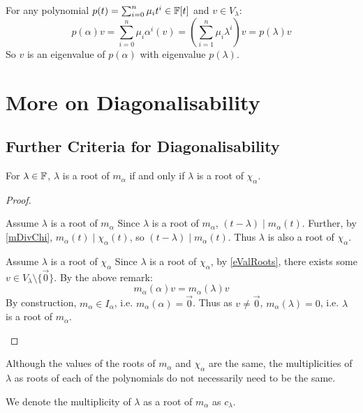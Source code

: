 \documentclass[../main.tex]{subfiles}
\begin{document}
\begin{remark}
  For any polynomial $p(t) = \sum_{i = 0}^{n} \mu_i t^{i} \in \mathbb{F}[t]$ and $v \in V_{\lambda}$:
  \[
    p(\alpha)v = \sum_{i = 0}^{n} \mu_i \alpha^{i}(v) = \left(\sum_{i = 1}^{n} \mu_i \lambda^{i}\right)v = p(\lambda)v
  \]
  So $v$ is an eigenvalue of $p(\alpha)$ with eigenvalue $p(\lambda)$.
\end{remark}
\section{More on Diagonalisability}
\subsection{Further Criteria for Diagonalisability}
\begin{lemma}
  For $\lambda \in \mathbb{F}$, $\lambda$ is a root of $m_{\alpha}$ if and only if $\lambda$ is a root of $\chi_{\alpha}$. \label{mRoots}
\end{lemma}
\begin{proof}
  \begin{proofdirection}{Assume $\lambda$ is a root of $m_{\alpha}$}
    Since $\lambda$ is a root of $m_{\alpha}$, $(t - \lambda) \mid m_{\alpha}(t)$.
    Further, by \cref{mDivChi}, $m_{\alpha}(t) \mid \chi_{\alpha}(t)$, so $(t - \lambda) \mid m_{\alpha}(t)$.
    Thus $\lambda$ is also a root of $\chi_{\alpha}$.
  \end{proofdirection}
  \begin{proofdirection}{Assume $\lambda$ is a root of $\chi_{\alpha}$}
    Since $\lambda$ is a root of $\chi_{\alpha}$, by \cref{eValRoots}, there exists some $v \in V_{\lambda} \setminus \{\vec{0}\}$.
    By the above remark:
    \[
      m_{\alpha}(\alpha)v = m_{\alpha}(\lambda)v
    \]
    By construction, $m_{\alpha} \in I_{\alpha}$, i.e. $m_{\alpha}(\alpha) = \vec{0}$.
    Thus as $v \neq \vec{0}$, $m_{\alpha}(\lambda) = 0$, i.e. $\lambda$ is a root of $m_{\alpha}$.
  \end{proofdirection}
\end{proof}
\begin{remark}[Warning]
  Although the values of the roots of $m_{\alpha}$ and $\chi_{\alpha}$ are the same, the multiplicities of $\lambda$ as roots of each of the polynomials do not necessarily need to be the same.
\end{remark}
\begin{remark}[Notation]
  We denote the multiplicity of $\lambda$ as a root of $m_{\alpha}$ as $c_{\lambda}$.
\end{remark}
\end{document}
